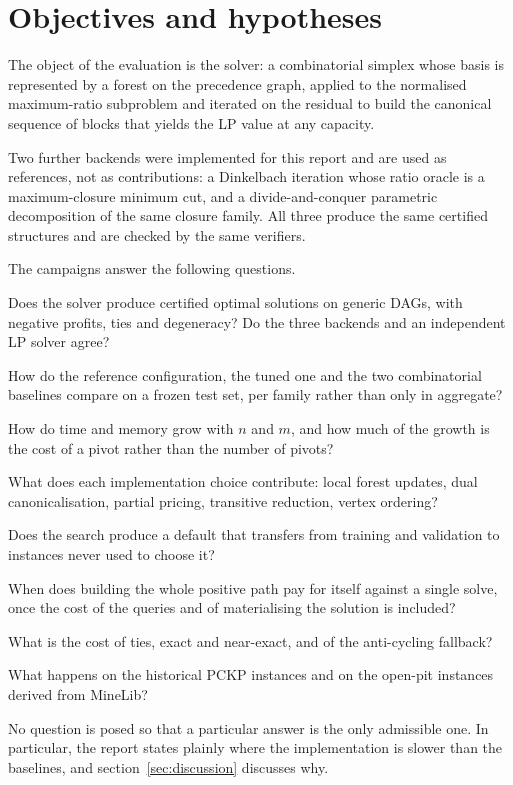 \section{Objectives and hypotheses}
\label{sec:objectives}

The object of the evaluation is the \FS{} solver: a combinatorial simplex whose
basis is represented by a forest on the precedence graph, applied to the
normalised maximum-ratio subproblem and iterated on the residual to build the
canonical sequence of blocks that yields the LP value at any capacity.

Two further backends were implemented for this report and are used as
references, not as contributions: a Dinkelbach iteration whose ratio oracle is a
maximum-closure minimum cut, and a divide-and-conquer parametric decomposition
of the same closure family. All three produce the same certified structures and
are checked by the same verifiers.

The campaigns answer the following questions.

\begin{description}[leftmargin=2.4em,style=nextline]
  \item[E1 Correctness] Does the solver produce certified optimal solutions on
    generic DAGs, with negative profits, ties and degeneracy? Do the three
    backends and an independent LP solver agree?
  \item[E2 Overall performance] How do the reference \FS{} configuration, the
    tuned one and the two combinatorial baselines compare on a frozen test set,
    per family rather than only in aggregate?
  \item[E3 Scalability] How do time and memory grow with $n$ and $m$, and how
    much of the growth is the cost of a pivot rather than the number of pivots?
  \item[E4 Ablation] What does each implementation choice contribute: local
    forest updates, dual canonicalisation, partial pricing, transitive
    reduction, vertex ordering?
  \item[E5 Tuning] Does the search produce a default that transfers from
    training and validation to instances never used to choose it?
  \item[E6 One capacity against many] When does building the whole positive path
    pay for itself against a single solve, once the cost of the queries and of
    materialising the solution is included?
  \item[E7 Degeneracy and numerics] What is the cost of ties, exact and
    near-exact, and of the anti-cycling fallback?
  \item[E8 Applied instances] What happens on the historical PCKP instances and
    on the open-pit instances derived from MineLib?
\end{description}

No question is posed so that a particular answer is the only admissible one. In
particular, the report states plainly where the \FS{} implementation is slower
than the baselines, and section~\ref{sec:discussion} discusses why.
